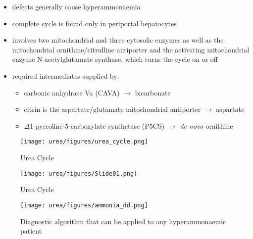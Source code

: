 \documentclass{scrartcl}
\begin{document}
\chemnameinit{}
\chemnameinit{}

\begin{itemize}
\item defects generally cause hyperammonaemia
\item complete cycle is found only in periportal hepatocytes
\item involves two mitochondrial and three cytosolic enzymes as well as
the mitochondrial ornithine/citrulline antiporter and the activating
mitochondrial enzyme N-acetylglutamate synthase, which turns the
cycle on or off
\item required intermediates supplied by:
\begin{itemize}
\item carbonic anhydrase Va (CAVA) \(\to\) bicarbonate
\item citrin is the aspartate/glutamate mitochondrial antiporter  \(\to\) aspartate
\item \(\Delta\)1-pyrroline-5-carboxylate synthetase (P5CS) \(\to\) \emph{de novo} ornithine
\end{itemize}
\end{itemize}

\begin{figure}[htbp]
\centering
\texttt{[image: urea/figures/urea\_cycle.png]}
\caption{\label{fig:orgfa01c86}Urea Cycle}
\end{figure}


\begin{figure}[htbp]
\centering
\texttt{[image: urea/figures/Slide01.png]}
\caption{\label{fig:orga520dd4}Urea Cycle}
\end{figure}


\begin{figure}[htbp]
\centering
\texttt{[image: urea/figures/ammonia\_dd.png]}
\caption{\label{fig:org84dc1e1}Diagnostic algorithm that can be applied to any hyperammonaemic patient}
\end{figure}
\end{document}
